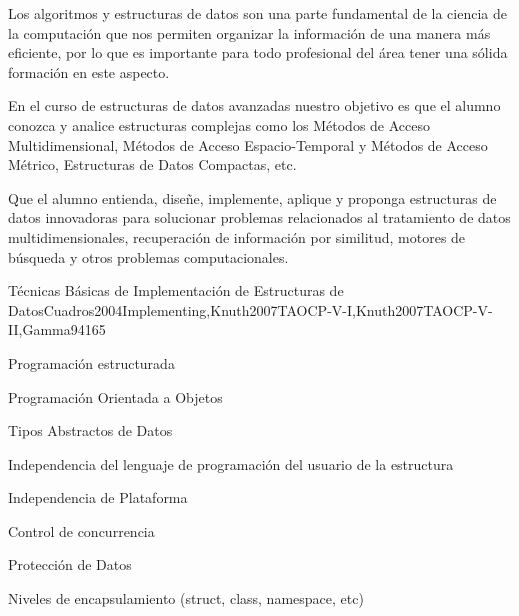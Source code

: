 \begin{syllabus}


\begin{justification}
Los algoritmos y estructuras de datos son una parte fundamental de la ciencia de la computación que nos 
permiten organizar la información de una manera más eficiente, por lo que es importante para todo 
profesional del área tener una sólida formación en este aspecto.

En el curso de estructuras de datos avanzadas nuestro objetivo es que el alumno conozca y analice 
estructuras complejas como los Métodos de Acceso Multidimensional, 
Métodos de Acceso Espacio-Temporal y 
Métodos de Acceso Métrico, Estructuras de Datos Compactas, etc.
\end{justification}

\begin{goals}
\item Que el alumno entienda, diseñe, implemente, aplique y
proponga estructuras de datos innovadoras para solucionar
problemas relacionados al tratamiento de datos multidimensionales,
recuperación de información por similitud, motores de búsqueda y
otros problemas computacionales.
\end{goals}

\begin{outcomes}
\end{outcomes}

\begin{competences}
    \item {} 
    \item {} 
\end{competences}

\begin{unit}{Técnicas Básicas de Implementación de Estructuras de Datos}{Cuadros2004Implementing,Knuth2007TAOCP-V-I,Knuth2007TAOCP-V-II,Gamma94}{16}{5}
   \begin{topics}
         \item Programación estructurada
         \item Programación Orientada a Objetos
         \item Tipos Abstractos de Datos
         \item Independencia del lenguaje de programación del usuario de la estructura
         \item Independencia de Plataforma
         \item Control de concurrencia
         \item Protección de Datos
         \item Niveles de encapsulamiento (struct, class, namespace, etc)
   \end{topics}


\end{unit}
\end{syllabus}
